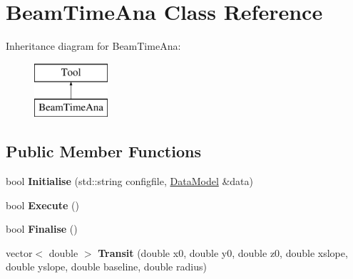 \hypertarget{classBeamTimeAna}{\section{Beam\-Time\-Ana Class Reference}
\label{classBeamTimeAna}
}
Inheritance diagram for Beam\-Time\-Ana\-:\begin{figure}[H]
\begin{center}
\leavevmode
\includegraphics[height=2.000000cm]{classBeamTimeAna}
\end{center}
\end{figure}
\subsection*{Public Member Functions}
\begin{DoxyCompactItemize}
\item 
\hypertarget{classBeamTimeAna_ac5cfa1bfcae38f8b06e35165c34bc7a1}{bool {\bfseries Initialise} (std\-::string configfile, \hyperlink{classDataModel}{Data\-Model} \&data)}\label{classBeamTimeAna_ac5cfa1bfcae38f8b06e35165c34bc7a1}

\item 
\hypertarget{classBeamTimeAna_a7b308e1c38e71d712f86134f32d6f608}{bool {\bfseries Execute} ()}\label{classBeamTimeAna_a7b308e1c38e71d712f86134f32d6f608}

\item 
\hypertarget{classBeamTimeAna_a6327c7597f973dc8d379bab637d49158}{bool {\bfseries Finalise} ()}\label{classBeamTimeAna_a6327c7597f973dc8d379bab637d49158}

\item 
\hypertarget{classBeamTimeAna_a7371db48a169030dc1f3c4aef1d2118f}{vector$<$ double $>$ {\bfseries Transit} (double x0, double y0, double z0, double xslope, double yslope, double baseline, double radius)}\label{classBeamTimeAna_a7371db48a169030dc1f3c4aef1d2118f}

\end{DoxyCompactItemize}
